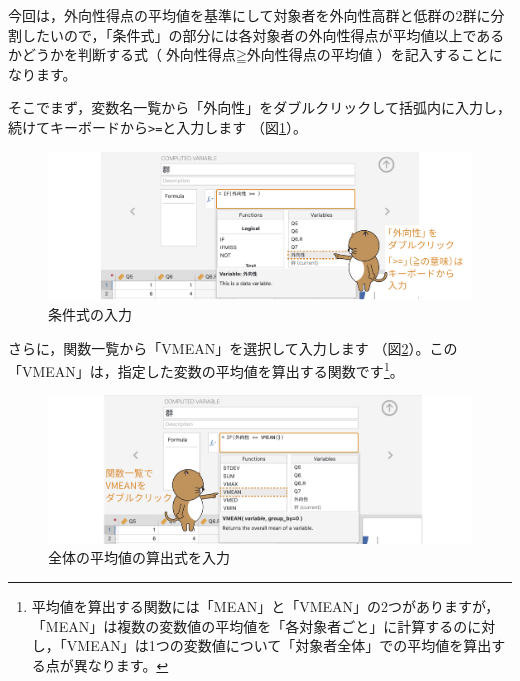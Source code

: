 \documentclass[
  12pt,
  a5jpaper,
  lualatex, ja=standard]{bxjsbook}
\begin{document}
今回は，外向性得点の平均値を基準にして対象者を外向性高群と低群の2群に分割したいので，「条件式」の部分には各対象者の外向性得点が平均値以上であるかどうかを判断する式（\(\text{外向性得点} \geqq \text{外向性得点の平均値}\)）を記入することになります。

そこでまず，変数名一覧から「外向性」をダブルクリックして括弧内に入力し，続けてキーボードから\texttt{\textgreater{}=}と入力します
（図\ref{fig:basics-exercise-group-if-formula}）。

\begin{figure}[!ht]

{\centering \includegraphics[width=1\linewidth]{images/basics/exercise-group-if-formula} 

}

\caption{条件式の入力}\label{fig:basics-exercise-group-if-formula}
\end{figure}

さらに，関数一覧から「VMEAN」を選択して入力します
（図\ref{fig:basics-exercise-group-vmean}）。この「VMEAN」は，指定した変数の平均値を算出する関数です\footnote{平均値を算出する関数には「MEAN」と「VMEAN」の2つがありますが，「MEAN」は複数の変数値の平均値を「各対象者ごと」に計算するのに対し，「VMEAN」は1つの変数値について「対象者全体」での平均値を算出する点が異なります。}。

\begin{figure}[!ht]

{\centering \includegraphics[width=1\linewidth]{images/basics/exercise-group-vmean} 

}

\caption{全体の平均値の算出式を入力}\label{fig:basics-exercise-group-vmean}
\end{figure}
\end{document}
